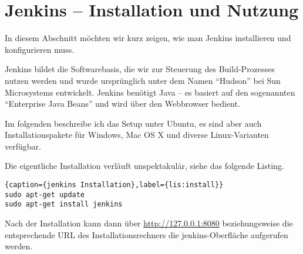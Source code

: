 \section{Jenkins -- Installation und Nutzung}

In diesem Abschnitt möchten wir kurz zeigen, wie man Jenkins installieren und konfigurieren muss.

Jenkins bildet die Softwarebasis, die wir zur Steuerung des Build-Prozesses nutzen werden und wurde ursprünglich unter dem Namen \enquote{Hudson} bei Sun Microsystems entwickelt. Jenkins benötigt Java -- es basiert auf den sogenannten \enquote{Enterprise Java Beans} und wird über den Webbrowser bedient. 

Im folgenden beschreibe ich das Setup unter Ubuntu, es sind aber auch Installationspakete für Windows, Mac OS X und diverse Linux-Varianten verfügbar.

Die eigentliche Installation verläuft unspektakulär, siehe das folgende Listing.

\begin{lstlisting}{caption={jenkins Installation},label={lis:install}}
sudo apt-get update
sudo apt-get install jenkins
\end{lstlisting}

Nach der Installation kann dann über \url{http://127.0.0.1:8080} beziehungsweise die entsprechende URL des Installationsrechners die jenkins-Oberfläche aufgerufen werden.

